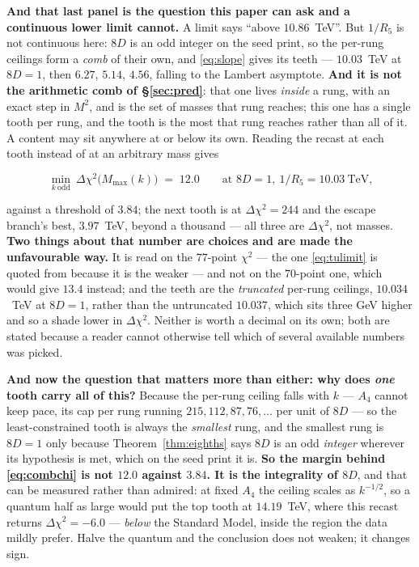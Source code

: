 \documentclass[11pt,a4paper]{article}
\newenvironment{keyeq}
  {\begin{center}\setlength{\fboxsep}{9pt}\setlength{\fboxrule}{0.8pt}%
   \begin{lrbox}{\keyeqbox}\begin{minipage}{0.88\textwidth}}
  {\end{minipage}\end{lrbox}%
   \fcolorbox{hdrblue!55}{hdrblue!6}{\usebox{\keyeqbox}}\end{center}}
\begin{document}
\noindent\textbf{And that last panel is the question this paper can ask and a continuous lower
limit cannot.} A limit says ``above $10.86$~TeV''. But $1/R_5$ is not continuous here: $8D$ is an
odd integer on the seed \cite{KM25} print, so the per-rung ceilings form a \emph{comb} of their own, and
\eqref{eq:slope} gives its teeth ---
$10.03$~TeV at $8D=1$, then $6.27$, $5.14$, $4.56$, falling to the Lambert asymptote.
\textbf{And it is not the arithmetic comb of \S\ref{sec:pred}}: that one lives \emph{inside}
a rung, with an exact step in $M^2$, and is the set of masses that rung reaches; this one has
a single tooth per rung, and the tooth is the most that rung reaches rather than all of it. A
content may sit anywhere at or below its own. Reading the
recast at each tooth instead of at an arbitrary mass gives
\begin{keyeq}
\begin{equation}\label{eq:combchi}
  \min_{k\ \mathrm{odd}}\ \Delta\chi^2\big(M_{\max}(k)\big)\;=\;12.0
  \qquad\text{at } 8D=1,\ 1/R_5=10.03\ \text{TeV,}
\end{equation}
\end{keyeq}
\noindent against a threshold of $3.84$; the next tooth is at $\Delta\chi^2=244$ and the escape
branch's best, $3.97$~TeV, beyond a thousand --- all three are $\Delta\chi^2$, not masses. \textbf{Two things about that number are choices and are made the
unfavourable way.} It is read on the $77$-point $\chi^2$ --- the one \eqref{eq:tulimit} is quoted
from because it is the weaker --- and not on the $70$-point one, which would give $13.4$ instead;
and the teeth are the \emph{truncated} per-rung ceilings, $10.034$~TeV at $8D=1$, rather than the
untruncated $10.037$, which sits three GeV higher and so a shade lower in $\Delta\chi^2$. Neither
is worth a decimal on its own; both are stated because a reader cannot otherwise tell which of
several available numbers was picked.

\noindent\textbf{And now the question that matters more than either: why does \emph{one} tooth
carry all of this?} Because the per-rung ceiling falls with $k$ --- $A_4$ cannot keep pace, its
cap per rung running $215,112,87,76,\dots$ per unit of $8D$ --- so the least-constrained tooth is
always the \emph{smallest} rung, and the smallest rung is $8D=1$ only because
Theorem~\ref{thm:eighths} says $8D$ is an odd \emph{integer} wherever its hypothesis is met, which
on the seed \cite{KM25} print it is. \textbf{So the margin behind
\eqref{eq:combchi} is not $12.0$ against $3.84$. It is the integrality of $8D$}, and that can be
measured rather than admired: at fixed $A_4$ the ceiling scales as $k^{-1/2}$, so a quantum half
as large would put the top tooth at $14.19$~TeV, where this recast returns
$\Delta\chi^2=-6.0$ --- \emph{below} the Standard Model, inside the region the data mildly prefer.
Halve the quantum and the conclusion does not weaken; it changes sign.
\end{document}
